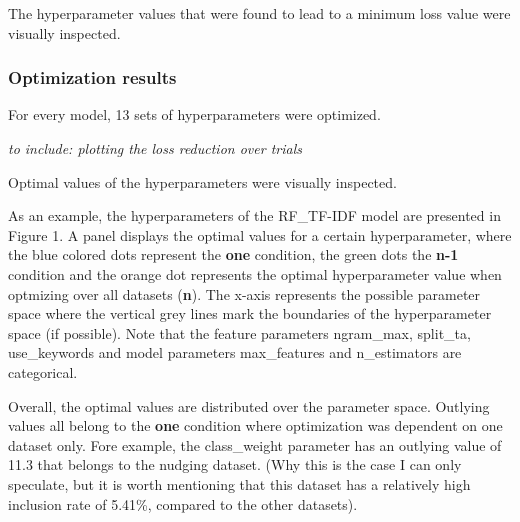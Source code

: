 \documentclass[
]{article}
\begin{document}
The hyperparameter values that were found to lead to a minimum loss
value were visually inspected.

\hypertarget{optimization-results}{%
\subsubsection{Optimization results}\label{optimization-results}}

For every model, 13 sets of hyperparameters were optimized.

\emph{to include: plotting the loss reduction over trials}

Optimal values of the hyperparameters were visually inspected.

As an example, the hyperparameters of the RF\_TF-IDF model are presented
in Figure 1. A panel displays the optimal values for a certain
hyperparameter, where the blue colored dots represent the \textbf{one}
condition, the green dots the \textbf{n-1} condition and the orange dot
represents the optimal hyperparameter value when optmizing over all
datasets (\textbf{n}). The x-axis represents the possible parameter
space where the vertical grey lines mark the boundaries of the
hyperparameter space (if possible). Note that the feature parameters
ngram\_max, split\_ta, use\_keywords and model parameters max\_features
and n\_estimators are categorical.

Overall, the optimal values are distributed over the parameter space.
Outlying values all belong to the \textbf{one} condition where
optimization was dependent on one dataset only. Fore example, the
class\_weight parameter has an outlying value of 11.3 that belongs to
the nudging dataset. (Why this is the case I can only speculate, but it
is worth mentioning that this dataset has a relatively high inclusion
rate of 5.41\%, compared to the other datasets).
\end{document}
